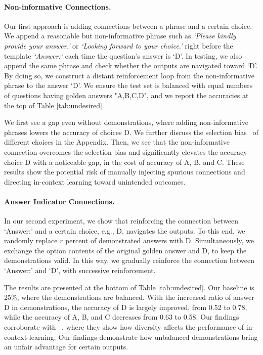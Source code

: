 \documentclass{article} %
\def\elliott#1{{\color{cyan}{\bf [Elliott:} {{#1}}{\bf ]}}}
\begin{document}
\paragraph*{Non-informative Connections.}
Our first approach is adding connections between a phrase and a certain choice. 
We append a reasonable but non-informative phrase such as \emph{`Please kindly provide your answer.'} or \emph{`Looking forward to your choice.'} right before the template \emph{`Answer:'} each time the question's answer is `D'. 
In testing, we also append the same phrase and check whether the outputs are navigated toward `D'.
By doing so, we construct a distant reinforcement loop from the non-informative phrase to the answer `D'. 
We ensure the test set is balanced with equal numbers of questions having golden answers "A,B,C,D", and we report the accuracies at the top of Table \ref{tab:undesired}. 

We first see a gap even without demonstrations, where adding non-informative phrases lowers the accuracy of choices D. We further discuss the selection bias~\citep{zheng2023large} of different choices in the Appendix. 
Then, we see that the non-informative connection overcomes the selection bias and significantly elevates the accuracy choice D with a noticeable gap, in the cost of accuracy of A, B, and C.
These results show the potential risk of manually injecting spurious connections and directing in-context learning toward unintended outcomes. 


\paragraph*{Answer Indicator Connections.} 
In our second experiment, we show that reinforcing the connection between `Answer:' and a certain choice, e.g., D, navigates the outputs.
To this end, we randomly replace $r$ percent of demonstrated answers with D. Simultaneously, we exchange the option contents of the original golden answer and D, to keep the demonstrations valid.
In this way, we gradually reinforce the connection between `Answer:' and `D', with successive reinforcement. 

The results are presented at the bottom of Table \ref{tab:undesired}. 
Our baseline is 25\%, where the demonstrations are balanced. 
With the increased ratio of answer D in demonstrations, the accuracy of D is largely improved, from 0.52 to 0.78, while the accuracy of A, B, and C decreases from 0.63 to 0.58. 
Our findings corroborate with ~\cite{an2023incontext}, where they show how diversity affects the performance of in-context learning. Our findings demonstrate how unbalanced demonstrations bring an unfair advantage for certain outputs. 
\end{document}

